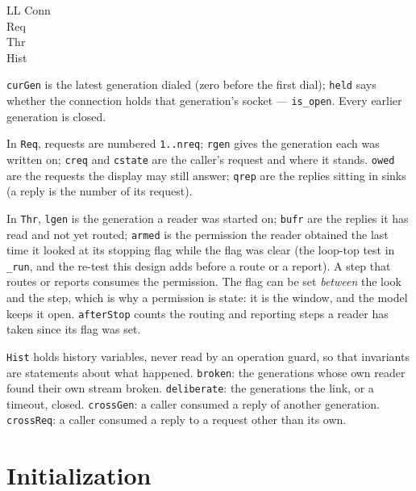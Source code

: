 \documentclass[a4paper,10pt,fleqn]{article}
\begin{document}
\begin{schema}{LL}
  Conn \\
  Req \\
  Thr \\
  Hist
\end{schema}


\texttt{curGen} is the latest generation dialed (zero before the first dial);
\texttt{held} says whether the connection holds that generation's socket ---
\texttt{is\_open}.  Every earlier generation is closed.

In \texttt{Req}, requests are numbered \texttt{1..nreq}; \texttt{rgen} gives
the generation each was written on; \texttt{creq} and \texttt{cstate} are the
caller's request and where it stands.  \texttt{owed} are the requests the
display may still answer; \texttt{qrep} are the replies sitting in sinks (a
reply is the number of its request).

In \texttt{Thr}, \texttt{lgen} is the generation a reader was started on;
\texttt{bufr} are the replies it has read and not yet routed;
\texttt{armed} is the permission the reader obtained the last time it looked
at its stopping flag while the flag was clear (the loop-top test in
\texttt{\_run}, and the re-test this design adds before a route or a report).
A step that routes or reports consumes the permission.  The flag can be set
\emph{between} the look and the step, which is why a permission is state: it
is the window, and the model keeps it open.  \texttt{afterStop} counts the
routing and reporting steps a reader has taken since its flag was set.

\texttt{Hist} holds history variables, never read by an operation guard, so
that invariants are statements about what happened.  \texttt{broken}: the
generations whose own reader found their own stream broken.
\texttt{deliberate}: the generations the link, or a timeout, closed.
\texttt{crossGen}: a caller consumed a reply of another generation.
\texttt{crossReq}: a caller consumed a reply to a request other than its own.

\section{Initialization}
\end{document}
